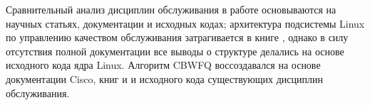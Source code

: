 Сравнительный анализ дисциплин обслуживания в работе основываются на научных статьях, документации и исходных кодах;
архитектура подсистемы Linux по управлению качеством обслуживания затрагивается в книге \cite{tcpip}, однако
в силу отсутствия полной документации все выводы о структуре делались на основе исходного кода ядра Linux.
Алгоритм CBWFQ воссоздавался на основе документации Cisco, книг \cite{tcpip} и \cite{Vagesna} и исходного кода
существующих дисциплин обслуживания. 
